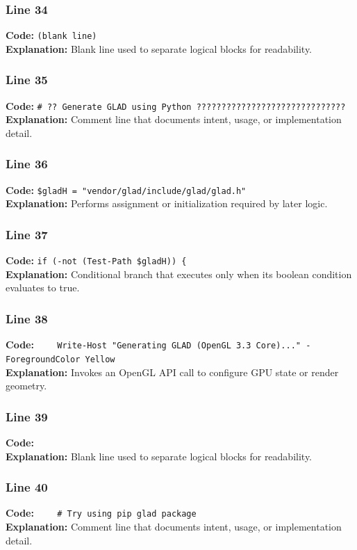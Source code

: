 \documentclass[11pt,a4paper]{article}
\begin{document}
\subsubsection*{Line 34}
\textbf{Code:} \texttt{(blank line)}\\
\textbf{Explanation:} Blank line used to separate logical blocks for readability.

\subsubsection*{Line 35}
\textbf{Code:} \verb|# ?? Generate GLAD using Python ??????????????????????????????|\\
\textbf{Explanation:} Comment line that documents intent, usage, or implementation detail.

\subsubsection*{Line 36}
\textbf{Code:} \verb|$gladH = "vendor/glad/include/glad/glad.h"|\\
\textbf{Explanation:} Performs assignment or initialization required by later logic.

\subsubsection*{Line 37}
\textbf{Code:} \verb|if (-not (Test-Path $gladH)) {|\\
\textbf{Explanation:} Conditional branch that executes only when its boolean condition evaluates to true.

\subsubsection*{Line 38}
\textbf{Code:} \verb|    Write-Host "Generating GLAD (OpenGL 3.3 Core)..." -ForegroundColor Yellow|\\
\textbf{Explanation:} Invokes an OpenGL API call to configure GPU state or render geometry.

\subsubsection*{Line 39}
\textbf{Code:} \verb|    |\\
\textbf{Explanation:} Blank line used to separate logical blocks for readability.

\subsubsection*{Line 40}
\textbf{Code:} \verb|    # Try using pip glad package|\\
\textbf{Explanation:} Comment line that documents intent, usage, or implementation detail.
\end{document}
